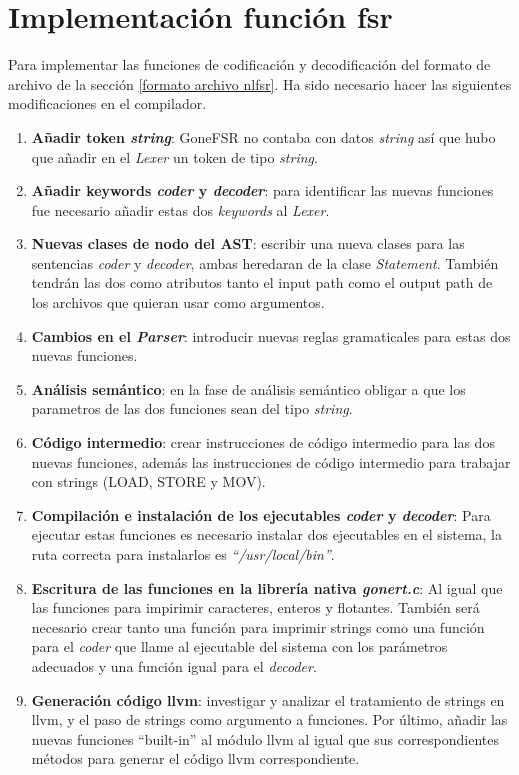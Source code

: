 \section{Implementación función fsr}
Para implementar las funciones de codificación y decodificación del formato de archivo de la sección \ref{formato archivo nlfsr}. Ha sido necesario hacer las siguientes modificaciones en el compilador.
\begin{enumerate}
    \item \textbf{Añadir token \textit{string}}: GoneFSR no contaba con datos \textit{string} así que hubo que añadir en el \textit{Lexer} un token de tipo \textit{string}.
    \item \textbf{Añadir keywords \textit{coder} y \textit{decoder}}: para identificar las nuevas funciones fue necesario añadir estas dos \textit{keywords} al \textit{Lexer}.
    \item \textbf{Nuevas clases de nodo del AST}: escribir una nueva clases para las sentencias \textit{coder} y \textit{decoder}, ambas heredaran de la clase \textit{Statement}. También tendrán las dos como atributos tanto el input path como el output path de los archivos que quieran usar como argumentos.
    \item \textbf{Cambios en el \textit{Parser}}: introducir nuevas reglas gramaticales para estas dos nuevas funciones.
    \item \textbf{Análisis semántico}: en la fase de análisis semántico obligar a que los parametros de las dos funciones sean del tipo \textit{string}.
    \item \textbf{Código intermedio}: crear instrucciones de código intermedio para las dos nuevas funciones, además las instrucciones de código intermedio para trabajar con strings (LOAD, STORE y MOV).
    \item \textbf{Compilación e instalación de los ejecutables \textit{coder} y \textit{decoder}}: Para ejecutar estas funciones es necesario instalar dos ejecutables en el sistema, la ruta correcta para instalarlos es \textit{``/usr/local/bin''}.
    \item \textbf{Escritura de las funciones en la librería nativa \textit{gonert.c}}: Al igual que las funciones para impirimir caracteres, enteros y flotantes. También será necesario crear tanto una función para imprimir strings como una función para el \textit{coder} que llame al ejecutable del sistema con los parámetros adecuados y una función igual para el \textit{decoder}.
    \item \textbf{Generación código llvm}: investigar y analizar el tratamiento de strings en llvm, y el paso de strings como argumento a funciones. Por último, añadir las nuevas funciones ``built-in'' al módulo llvm al igual que sus correspondientes métodos para generar el código llvm correspondiente.\\
\end{enumerate}
